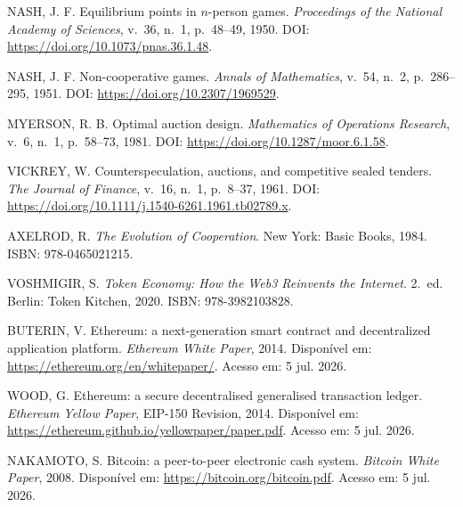 \begin{enumerate}[{[1]}]
    \item \label{ref:nash1950} NASH, J. F. Equilibrium points in $n$-person games. \textit{Proceedings of the National Academy of Sciences}, v.~36, n.~1, p.~48--49, 1950. DOI: \url{https://doi.org/10.1073/pnas.36.1.48}.
    
    \item \label{ref:nash1951} NASH, J. F. Non-cooperative games. \textit{Annals of Mathematics}, v.~54, n.~2, p.~286--295, 1951. DOI: \url{https://doi.org/10.2307/1969529}.
    
    \item \label{ref:myerson1981} MYERSON, R. B. Optimal auction design. \textit{Mathematics of Operations Research}, v.~6, n.~1, p.~58--73, 1981. DOI: \url{https://doi.org/10.1287/moor.6.1.58}.
    
    \item \label{ref:vickrey1961} VICKREY, W. Counterspeculation, auctions, and competitive sealed tenders. \textit{The Journal of Finance}, v.~16, n.~1, p.~8--37, 1961. DOI: \url{https://doi.org/10.1111/j.1540-6261.1961.tb02789.x}.
    
    \item \label{ref:axelrod1984} AXELROD, R. \textit{The Evolution of Cooperation}. New York: Basic Books, 1984. ISBN: 978-0465021215.
    
    \item \label{ref:voshmgir2020} VOSHMIGIR, S. \textit{Token Economy: How the Web3 Reinvents the Internet}. 2.~ed. Berlin: Token Kitchen, 2020. ISBN: 978-3982103828.
    
    \item \label{ref:buterin2014} BUTERIN, V. Ethereum: a next-generation smart contract and decentralized application platform. \textit{Ethereum White Paper}, 2014. Disponível em: \url{https://ethereum.org/en/whitepaper/}. Acesso em: 5 jul. 2026.
    
    \item \label{ref:wood2014} WOOD, G. Ethereum: a secure decentralised generalised transaction ledger. \textit{Ethereum Yellow Paper}, EIP-150 Revision, 2014. Disponível em: \url{https://ethereum.github.io/yellowpaper/paper.pdf}. Acesso em: 5 jul. 2026.
    
    \item \label{ref:nakamoto2008} NAKAMOTO, S. Bitcoin: a peer-to-peer electronic cash system. \textit{Bitcoin White Paper}, 2008. Disponível em: \url{https://bitcoin.org/bitcoin.pdf}. Acesso em: 5 jul. 2026.
    

\end{enumerate}
